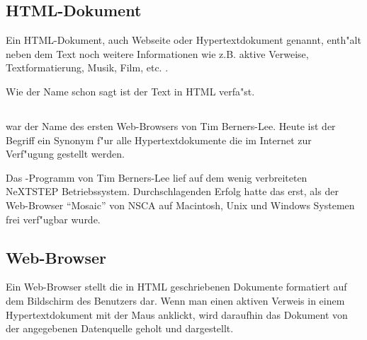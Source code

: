 \subsection{HTML-Dokument}
Ein HTML-Dokument, auch Webseite oder Hypertextdokument genannt, enth"alt neben dem Text noch weitere Informationen wie z.B. aktive Verweise, Textformatierung, Musik, Film, etc. .

Wie der Name schon sagt ist der Text in HTML verfa"st.


\subsection{\www}
\www war der Name des ersten Web-Browsers von Tim Berners-Lee. Heute ist der Begriff \www ein Synonym f"ur alle Hypertextdokumente die im Internet zur Verf"ugung gestellt werden.

Das \www-Programm von Tim Berners-Lee lief auf dem wenig verbreiteten NeXTSTEP Betriebssystem. Durchschlagenden Erfolg hatte das \www erst, als der Web-Browser "`Mosaic"' von NSCA auf Macintosh, Unix und Windows Systemen frei verf"ugbar wurde. 


\subsection{Web-Browser}
Ein Web-Browser stellt die in HTML geschriebenen Dokumente formatiert auf dem Bildschirm des Benutzers dar. Wenn man einen aktiven Verweis in einem Hypertextdokument mit der Maus anklickt, wird daraufhin das Dokument von der angegebenen Datenquelle geholt und dargestellt.



